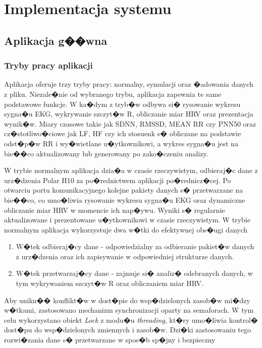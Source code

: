 \chapter{Implementacja systemu}

\section{Aplikacja g��wna}
\subsection{Tryby pracy aplikacji}
Aplikacja oferuje trzy tryby pracy: normalny, symulacji oraz �adowania danych z
pliku. Niezale�nie od wybranego trybu, aplikacja zapewnia te same podstawowe
funkcje. W ka�dym z tryb�w odbywa si� rysowanie wykresu sygna�u EKG, wykrywanie
szczyt�w R, obliczanie miar HRV oraz prezentacja wynik�w. Miary czasowe takie
jak SDNN, RMSSD, MEAN RR czy PNN50 oraz cz�stotliwo�ciowe jak LF, HF czy ich
stosuenk s� obliczane na podstawie odst�p�w RR i wy�wietlane u�ytkownikowi, a
wykres sygna�u jest na bie��co aktualizowany lub generowany po zako�czeniu
analizy.

W trybie normalnym aplikacja dzia�a w czasie rzeczywistym, odbieraj�c dane z
urz�dzenia Polar H10 za po�rednictwem aplikacji po�rednicz�cej. Po otwarciu
portu komunikacyjnego kolejne pakiety danych s� przetwarzane na bie��co, co
umo�liwia rysowanie wykresu sygna�u EKG oraz dynamiczne obliczanie miar HRV w
momencie ich nap�ywu. Wyniki s� regularnie aktualizowane i prezentowane
u�ytkownikowi w czasie rzeczywistym. W trybie normalnym aplikacja wykorzystuje
dwa w�tki do efektywnej obs�ugi danych
\begin{enumerate}
    \item W�tek odbieraj�cy dane - odpowiedzialny za odbieranie pakiet�w danych z
          urz�dzenia oraz ich zapisywanie w odpowiedniej strukturze danych.
    \item W�tek przetwarzaj�cy dane - zajmuje si� analiz� odebranych danych, w tym
          wykrywaniem szczyt�w R oraz obliczaniem miar HRV.
\end{enumerate}
Aby unikn�� konflikt�w w dost�pie do wsp�dzielonych zasob�w mi�dzy
w�tkami, zastosowano mechanizm synchronizacji oparty na semaforach. W tym celu
wykorzystano obiekt \emph{Lock} z modu�u \emph{threading}, kt�ry umo�liwia kontrol� dost�pu
do wsp�dzielonych zmiennych i zasob�w. Dzi�ki zastosowaniu tego rozwi�zania
dane s� przetwarzane w spos�b sp�jny i bezpieczny

